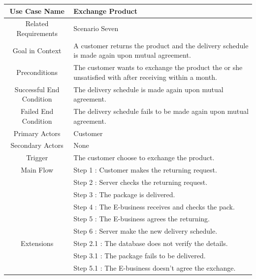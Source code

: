 \documentclass[12pt]{scrreprt}
\begin{document}
\begin{table}
  \centering
  \begin{tabular}{| c | p{11cm} |}
    \hline
    Use Case Name & Exchange Product\\
    \hline
    Related Requirements & Scenario Seven\\
    \hline
    Goal in Context & A customer returns the product and the delivery schedule
    is made again upon mutual agreement.\\
    \hline
    Preconditions & The customer wants to exchange the product the or she
    unsatisfied with after receiving within a month.\\
    \hline
    Successful End Condition & The delivery schedule is made again upon
    mutual agreement.\\
    \hline
    Failed End Condition & The delivery schedule fails to be made again upon
    mutual agreement.\\
    \hline
    Primary Actors & Customer\\
    \hline
    Secondary Actors & None\\
    \hline
    Trigger & The customer choose to exchange the product.\\
    \hline
    Main Flow & Step 1 : Customer makes the returning request.\\
    & Step 2 : Server checks the returning request.\\
    & Step 3 : The package is delivered.\\
    & Step 4 : The E-business receives and checks the pack.\\
    & Step 5 : The E-business agrees the returning.\\
    & Step 6 : Server make the new delivery schedule.\\
    \hline
    Extensions & Step 2.1 : The database does not verify the details.\\
    & Step 3.1 : The package fails to be delivered.\\
    & Step 5.1 : The E-business doesn't agree the exchange.\\
    \hline
  \end{tabular}
\end{table}
\end{document}
